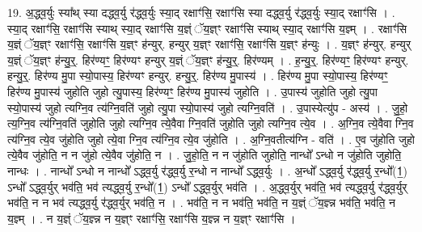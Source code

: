 \documentclass[17pt]{extarticle}
\begin{document}
19. अ॒द्ध्व॒र्युः स्या᳚थ् स्या दद्ध्व॒र्यु र॑द्ध्व॒र्युः स्या॒द् रक्षाꣳ॑सि॒ रक्षाꣳ॑सि स्या दद्ध्व॒र्यु र॑द्ध्व॒र्युः स्या॒द् रक्षाꣳ॑सि । . स्या॒द् रक्षाꣳ॑सि॒ रक्षाꣳ॑सि स्याथ् स्या॒द् रक्षाꣳ॑सि य॒ज्ञ्ं ॅय॒ज्ञ्ꣳ रक्षाꣳ॑सि स्याथ् स्या॒द् रक्षाꣳ॑सि य॒ज्ञ्म् । . रक्षाꣳ॑सि य॒ज्ञ्ं ॅय॒ज्ञ्ꣳ रक्षाꣳ॑सि॒ रक्षाꣳ॑सि य॒ज्ञ्ꣳ ह॑न्युर्. हन्युर् य॒ज्ञ्ꣳ रक्षाꣳ॑सि॒ रक्षाꣳ॑सि य॒ज्ञ्ꣳ ह॑न्युः । . य॒ज्ञ्ꣳ ह॑न्युर्. हन्युर् य॒ज्ञ्ं ॅय॒ज्ञ्ꣳ ह॑न्यु॒र्॒. हिर॑ण्यꣳ॒॒ हिर॑ण्यꣳ हन्युर् य॒ज्ञ्ं ॅय॒ज्ञ्ꣳ ह॑न्यु॒र्॒. हिर॑ण्यम् । . ह॒न्यु॒र्॒. हिर॑ण्यꣳ॒॒ हिर॑ण्यꣳ हन्युर्. हन्यु॒र्॒. हिर॑ण्य मु॒पा स्यो॒पास्य॒ हिर॑ण्यꣳ हन्युर्. हन्यु॒र्॒. हिर॑ण्य मु॒पास्य॑ । . हिर॑ण्य मु॒पा स्यो॒पास्य॒ हिर॑ण्यꣳ॒॒ हिर॑ण्य मु॒पास्य॑ जुहोति जुहो त्यु॒पास्य॒ हिर॑ण्यꣳ॒॒ हिर॑ण्य मु॒पास्य॑ जुहोति । . उ॒पास्य॑ जुहोति जुहो त्यु॒पा स्यो॒पास्य॑ जुहो त्यग्नि॒व त्य॑ग्नि॒वति॑ जुहो त्यु॒पा स्यो॒पास्य॑ जुहो त्यग्नि॒वति॑ । . उ॒पास्येत्यु॑प - अस्य॑ । . जु॒हो॒ त्य॒ग्नि॒व त्य॑ग्नि॒वति॑ जुहोति जुहो त्यग्नि॒व त्ये॒वैवा ग्नि॒वति॑ जुहोति जुहो त्यग्नि॒व त्ये॒व । . अ॒ग्नि॒व त्ये॒वैवा ग्नि॒व त्य॑ग्नि॒व त्ये॒व जु॑होति जुहो त्ये॒वा ग्नि॒व त्य॑ग्नि॒व त्ये॒व जु॑होति । . अ॒ग्नि॒वतीत्य॑ग्नि - वति॑ । . ए॒व जु॑होति जुहो त्ये॒वैव जु॑होति॒ न न जु॑हो त्ये॒वैव जु॑होति॒ न । . जु॒हो॒ति॒ न न जु॑होति जुहोति॒ नान्धो᳚ ऽन्धो न जु॑होति जुहोति॒ नान्धः । . नान्धो᳚ ऽन्धो न नान्धो᳚ ऽद्ध्व॒र्यु र॑द्ध्व॒र्यु र॒न्धो न नान्धो᳚ ऽद्ध्व॒र्युः । . अ॒न्धो᳚ ऽद्ध्व॒र्यु र॑द्ध्व॒र्यु र॒न्धो᳚(1॒) ऽन्धो᳚ ऽद्ध्व॒र्युर् भव॑ति॒ भव॑ त्यद्ध्व॒र्यु र॒न्धो᳚(1॒) ऽन्धो᳚ ऽद्ध्व॒र्युर् भव॑ति । . अ॒द्ध्व॒र्युर् भव॑ति॒ भव॑ त्यद्ध्व॒र्यु र॑द्ध्व॒र्युर् भव॑ति॒ न न भव॑ त्यद्ध्व॒र्यु र॑द्ध्व॒र्युर् भव॑ति॒ न । . भव॑ति॒ न न भव॑ति॒ भव॑ति॒ न य॒ज्ञ्ं ॅय॒ज्ञ्न्न भव॑ति॒ भव॑ति॒ न य॒ज्ञ्म् । . न य॒ज्ञ्ं ॅय॒ज्ञ्न्न न य॒ज्ञ्ꣳ रक्षाꣳ॑सि॒ रक्षाꣳ॑सि य॒ज्ञ्न्न न य॒ज्ञ्ꣳ रक्षाꣳ॑सि । \newline
\end{document}
